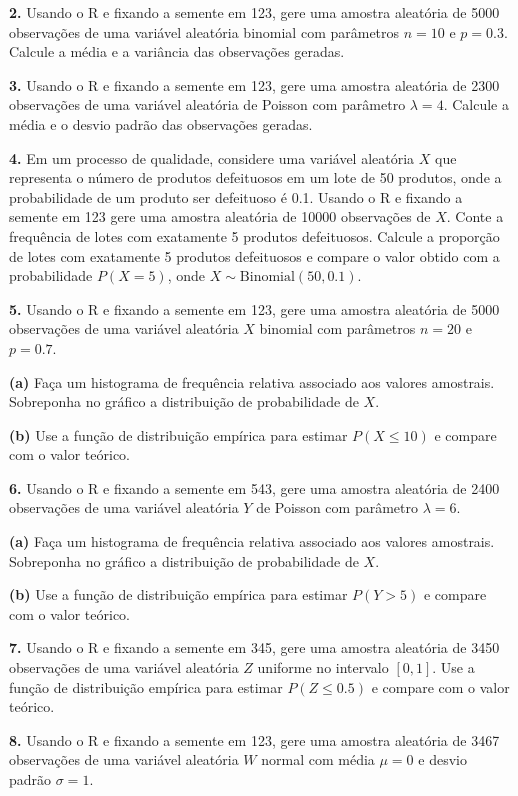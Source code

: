\documentclass[
]{book}
\begin{document}
\textbf{2.} Usando o R e fixando a semente em 123, gere uma amostra aleatória
de 5000 observações de uma variável aleatória binomial com parâmetros
\(n = 10\) e \(p = 0.3\). Calcule a média e a variância das observações
geradas.

\textbf{3.} Usando o R e fixando a semente em 123, gere uma amostra aleatória
de 2300 observações de uma variável aleatória de Poisson com parâmetro
\(\lambda = 4\). Calcule a média e o desvio padrão das observações
geradas.

\textbf{4.} Em um processo de qualidade, considere uma variável aleatória \(X\)
que representa o número de produtos defeituosos em um lote de 50
produtos, onde a probabilidade de um produto ser defeituoso é 0.1.
Usando o R e fixando a semente em 123 gere uma amostra aleatória de
10000 observações de \(X\). Conte a frequência de lotes com exatamente 5
produtos defeituosos. Calcule a proporção de lotes com exatamente 5
produtos defeituosos e compare o valor obtido com a probabilidade
\(P(X=5)\), onde \(X \sim \text{Binomial}(50, 0.1)\).

\textbf{5.} Usando o R e fixando a semente em 123, gere uma amostra aleatória
de 5000 observações de uma variável aleatória \(X\) binomial com
parâmetros \(n = 20\) e \(p = 0.7\).

\textbf{(a)} Faça um histograma de frequência relativa associado aos valores
amostrais. Sobreponha no gráfico a distribuição de probabilidade de \(X\).

\textbf{(b)} Use a função de distribuição empírica para estimar \(P(X\leq 10)\)
e compare com o valor teórico.

\textbf{6.} Usando o R e fixando a semente em 543, gere uma amostra aleatória
de 2400 observações de uma variável aleatória \(Y\) de Poisson com
parâmetro \(\lambda = 6\).

\textbf{(a)} Faça um histograma de frequência relativa associado aos valores
amostrais. Sobreponha no gráfico a distribuição de probabilidade de \(X\).

\textbf{(b)} Use a função de distribuição empírica para estimar \(P(Y > 5)\) e
compare com o valor teórico.

\textbf{7.} Usando o R e fixando a semente em 345, gere uma amostra aleatória
de 3450 observações de uma variável aleatória \(Z\) uniforme no intervalo
\([0, 1]\). Use a função de distribuição empírica para estimar
\(P(Z \leq 0.5)\) e compare com o valor teórico.

\textbf{8.} Usando o R e fixando a semente em 123, gere uma amostra aleatória
de 3467 observações de uma variável aleatória \(W\) normal com média
\(\mu = 0\) e desvio padrão \(\sigma = 1\).
\end{document}
